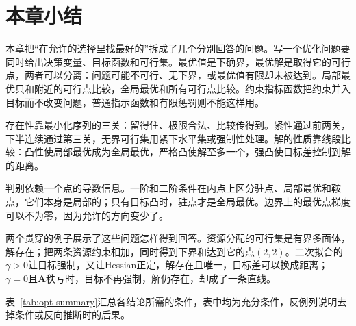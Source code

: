 \section{本章小结}
\label{sec:opt-summary}

本章把“在允许的选择里找最好的”拆成了几个分别回答的问题。写一个优化问题要同时给出决策变量、目标函数和可行集。最优值是下确界，最优解是取得它的可行点，两者可以分离：问题可能不可行、无下界，或最优值有限却未被达到。局部最优只和附近的可行点比较，全局最优和所有可行点比较。约束指标函数把约束并入目标而不改变问题，普通指示函数和有限惩罚则不能这样用。

存在性靠最小化序列的三关：留得住、极限合法、比较传得到。紧性通过前两关，下半连续通过第三关，无界可行集用紧下水平集或强制性处理。解的性质靠线段比较：凸性使局部最优成为全局最优，严格凸使解至多一个，强凸使目标差控制到解的距离。

判别依赖一个点的导数信息。一阶和二阶条件在内点上区分驻点、局部最优和鞍点，它们本身是局部的；只有目标凸时，驻点才是全局最优。边界上的最优点梯度可以不为零，因为允许的方向变少了。

两个贯穿的例子展示了这些问题怎样得到回答。资源分配的可行集是有界多面体，解存在；把两条资源约束相加，同时得到下界和达到它的点$(2,2)$。二次拟合的$\gamma>0$让目标强制，又让Hessian正定，解存在且唯一，目标差可以换成距离；$\gamma=0$且$\bm{A}$秩亏时，目标不再强制，解仍存在，却成了一条直线。

表~\ref{tab:opt-summary}汇总各结论所需的条件，表中均为充分条件，反例列说明去掉条件或反向推断时的后果。

